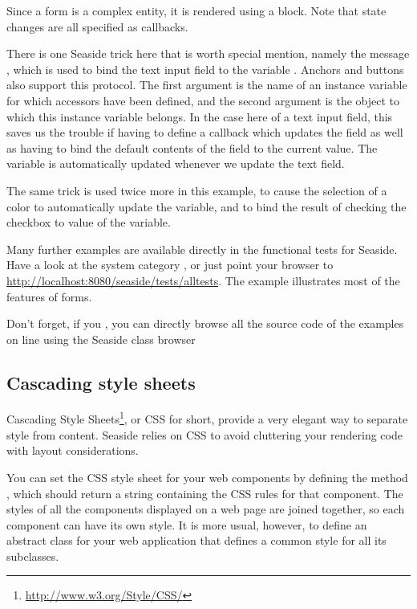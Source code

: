 \documentclass[a4paper,10pt,twoside]{book}
\begin{document}
Since a form is a complex entity, it is rendered using a block.
Note that state changes are all specified as callbacks.

There is one Seaside trick here that is worth special mention, namely the message , which is used to bind the text input field to the variable .
Anchors and buttons also support this protocol.
The first argument is the name of an instance variable for which accessors have been defined, and the second argument is the object to which this instance variable belongs.
In the case here of a text input field, this saves us the trouble if having to define a callback which updates the field as well as having to bind the default contents of the field to the current value.
The  variable is automatically updated whenever we update the text field.

The same trick is used twice more in this example, to cause the selection of a color to automatically update the  variable, and to bind the result of checking the checkbox to value of the  variable.

Many further examples are available directly in the functional tests for Seaside.
Have a look at the system category , or just point your browser to \url{http://localhost:8080/seaside/tests/alltests}.
The  example illustrates most of the features of forms.

Don't forget, if you , you can directly browse all the source code of the examples on line using the Seaside class browser

\subsection{Cascading style sheets}
\label{sec:css}

Cascading Style Sheets\footnote{\url{http://www.w3.org/Style/CSS/}}, or CSS for short, provide a very elegant way to separate style from content.
Seaside relies on CSS to avoid cluttering your rendering code with layout considerations.

You can set the CSS style sheet for your web components by defining the method , which should return a string containing the CSS rules for that component.
The styles of all the components displayed on a web page are joined together, so each component can have its own style.
It is more usual, however, to define an abstract class for your web application that defines a common style for all its subclasses.
\end{document}
